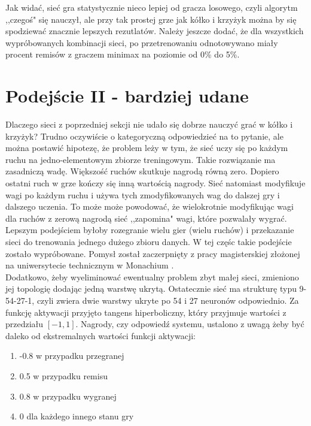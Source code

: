 \documentclass[licencjacka]{pracamgr}
\begin{document}
Jak widać, sieć gra statystycznie nieco lepiej od gracza losowego, czyli algorytm ,,czegoś" się nauczył, ale przy tak prostej grze jak kółko i krzyżyk można by się spodziewać znacznie lepszych rezutlatów. Należy jeszcze dodać, że dla wszystkich wypróbowanych kombinacji sieci, po przetrenowaniu odnotowywano miały procent remisów z graczem minimax na poziomie od 0\% do 5\%.


\section{Podejście II - bardziej udane}

Dlaczego sieci z poprzedniej sekcji nie udało się dobrze nauczyć grać w kółko i krzyżyk? Trudno oczywiście o kategoryczną odpowiedzieć na to pytanie, ale można postawić hipotezę, że problem leży w tym, że sieć uczy się po każdym ruchu na jedno-elementowym zbiorze treningowym. Takie rozwiązanie ma zasadniczą wadę. Większość ruchów skutkuje nagrodą równą zero. Dopiero ostatni ruch w grze kończy się inną wartością nagrody. Sieć natomiast modyfikuje wagi po każdym ruchu i używa tych zmodyfikowanych wag do dalszej gry i dalszego uczenia.  To może może powodować, że wielokrotnie modyfikując wagi dla ruchów z zerową nagrodą sieć ,,zapomina" wagi, które pozwalały wygrać. Lepszym podejściem byłoby rozegranie wielu gier (wielu ruchów) i przekazanie sieci do trenowania jednego dużego zbioru danych. W tej częśc takie podejście zostało wypróbowane. Pomysł został zaczerpnięty z pracy magisterskiej złożonej na uniwersytecie technicznym w Monachium \cite{TUM}.\\

Dodatkowo, żeby wyeliminować ewentualny problem zbyt małej sieci, zmieniono jej topologię dodając jedną warstwę ukrytą. Ostatecznie sieć ma strukturę typu 9-54-27-1, czyli zwiera dwie warstwy ukryte po 54 i 27 neuronów odpowiednio.  Za funkcję aktywacji przyjęto tangens hiperboliczny, który przyjmuje wartości z przedziału $[-1,1]$. Nagrody, czy odpowiedź systemu, ustalono z uwagą żeby być daleko od ekstremalnych wartości funkcji aktywacji:

\begin{enumerate}
	\item{-0.8 w przypadku przegranej}
	\item{0.5 w przypadku remisu }
	\item{0.8 w przypadku wygranej}
	\item{0 dla każdego innego stanu gry}
\end{enumerate}
\end{document}
